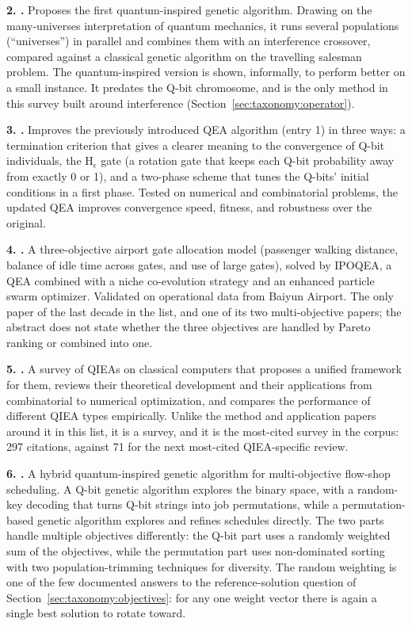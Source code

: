 \textbf{2. \citet{narayanan1996qiga}.} Proposes the first
quantum-inspired genetic algorithm. Drawing on the many-universes interpretation of
quantum mechanics, it runs several populations (``universes'') in
parallel and combines them with an interference crossover, compared
against a classical genetic algorithm on the travelling salesman
problem. The quantum-inspired version is shown, informally, to perform
better on a small instance. It predates the Q-bit chromosome, and is
the only method in this survey built around interference
(Section~\ref{sec:taxonomy:operator}).

\textbf{3. \citet{han2004hepsilon}.} Improves the previously
introduced QEA algorithm (entry 1) in three ways: a
termination criterion that gives a clearer meaning to the convergence
of Q-bit individuals, the H$_\epsilon$ gate (a rotation gate that keeps
each Q-bit probability away from exactly 0 or 1), and a two-phase
scheme that tunes the Q-bits' initial conditions in a first phase.
Tested on numerical and combinatorial problems, the updated QEA
improves convergence speed, fitness, and robustness over the original.

\textbf{4. \citet{deng2020gate}.} A three-objective airport gate
allocation model (passenger walking distance, balance of idle time
across gates, and use of large gates), solved by IPOQEA, a QEA
combined with a niche co-evolution strategy and an enhanced particle
swarm optimizer. Validated on operational data from Baiyun Airport. The only paper of the last decade in the list, and one of its
two multi-objective papers; the abstract does not state whether the
three objectives are handled by Pareto ranking or combined into one.

\textbf{5. \citet{zhang2011qieasurvey}.} A survey of QIEAs on
classical computers that proposes a unified framework for them,
reviews their theoretical development and their applications from
combinatorial to numerical optimization, and compares the performance
of different QIEA types empirically. Unlike the method and application
papers around it in this list, it is a survey, and it is the most-cited
survey in the corpus: 297 citations, against 71 for the next most-cited
QIEA-specific review.

\textbf{6. \citet{li2007hqga}.} A hybrid quantum-inspired genetic
algorithm for multi-objective flow-shop scheduling. A Q-bit genetic
algorithm explores the binary space, with a random-key decoding that
turns Q-bit strings into job permutations, while a permutation-based
genetic algorithm explores and refines schedules directly. The two
parts handle multiple objectives differently: the Q-bit part uses a
randomly weighted sum of the objectives, while the permutation part
uses non-dominated sorting with two population-trimming techniques for
diversity. The random weighting is one of the few documented answers to the
reference-solution question of Section~\ref{sec:taxonomy:objectives}:
for any one weight vector there is again a single best solution to
rotate toward.


